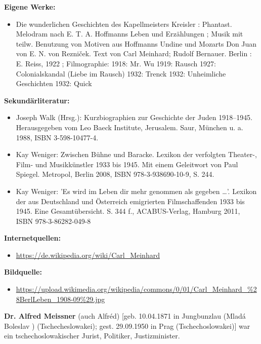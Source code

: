 \documentclass[a4paper]{article}
\begin{document}
\bigskip

\textbf{Eigene Werke:}

\begin{itemize}
\item Die wunderlichen Geschichten des Kapellmeisters Kreisler : Phantast. Melodram nach E. T. A. Hoffmanns Leben und
Erzählungen ; Musik mit teilw. Benutzung von Motiven aus Hoffmanns {\textquotedbl}Undine{\textquotedbl} und Mozarts
{\textquotedbl}Don Juan{\textquotedbl} von E. N. von Rezniček. Text von Carl Meinhard; Rudolf Bernauer. Berlin : E.
Reiss, 1922 ; Filmographie:  1918: Mr. Wu  1919: Rausch  1927: Colonialskandal (Liebe im Rausch)  1932: Trenck  1932:
Unheimliche Geschichten  1932: Quick
\end{itemize}

\bigskip

\textbf{Sekundärliteratur:}

\begin{itemize}
\item Joseph Walk (Hrsg.): Kurzbiographien zur Geschichte der Juden 1918–1945. Herausgegeben vom Leo Baeck Institute,
Jerusalem. Saur, München u. a. 1988, ISBN 3-598-10477-4.  
\item Kay Weniger: Zwischen Bühne und Baracke. Lexikon der verfolgten Theater-, Film- und Musikkünstler 1933 bis 1945.
Mit einem Geleitwort von Paul Spiegel. Metropol, Berlin 2008, ISBN 978-3-938690-10-9, S. 244.  
\item Kay Weniger: 'Es wird im Leben dir mehr genommen als gegeben …'. Lexikon der aus Deutschland und Österreich
emigrierten Filmschaffenden 1933 bis 1945. Eine Gesamtübersicht. S. 344 f., ACABUS-Verlag, Hamburg 2011, ISBN
978-3-86282-049-8
\end{itemize}

\bigskip


\bigskip

\textbf{Internetquellen:}

\begin{itemize}
\item \url{https://de.wikipedia.org/wiki/Carl_Meinhard} 
\end{itemize}

\bigskip

\textbf{Bildquelle:}

\begin{itemize}
\item
\href{https://upload.wikimedia.org/wikipedia/commons/0/01/Carl_Meinhard_(BerlLeben_1908-09).jpg}{https://upload.wikimedia.org/wikipedia/commons/0/01/Carl\_Meinhard\_\%28BerlLeben\_1908-09\%29.jpg}

\end{itemize}
\textbf{Dr. Alfred Meissner} (auch Alfréd) [geb. 10.04.1871 in Jungbunzlau (Mladá Boleslav ) (Tschecheslowakei); gest.
29.09.1950 in Prag (Tschechoslowakei)] war ein tschechoslowakischer Jurist, Politiker, Justizminister.
\end{document}

